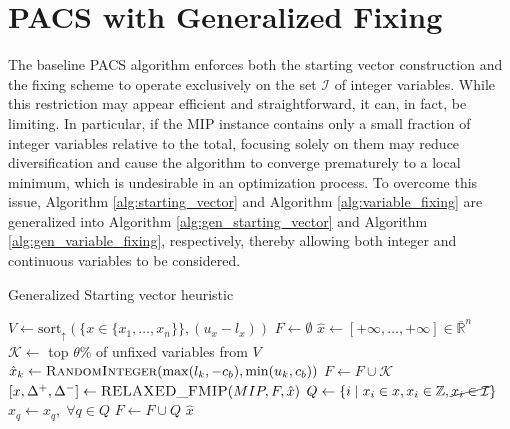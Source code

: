 \section{PACS with Generalized Fixing}\label{sec:gen_fixing}
The baseline PACS algorithm enforces both the starting vector construction and the fixing scheme to operate exclusively on the set $\mathcal{I}$ of integer variables. While this restriction may appear efficient and straightforward, it can, in fact, be limiting. In particular, if the MIP instance contains only a small fraction of integer variables relative to the total, focusing solely on them may reduce diversification and cause the algorithm to converge prematurely to a local minimum, which is undesirable in an optimization process.
To overcome this issue, Algorithm \ref{alg:starting_vector} and Algorithm \ref{alg:variable_fixing} are generalized into Algorithm \ref{alg:gen_starting_vector} and Algorithm \ref{alg:gen_variable_fixing}, respectively, thereby allowing both integer and continuous variables to be considered.
\begin{algorithm}[H]
\caption{Generalized Starting vector heuristic}\label{alg:gen_starting_vector}
\begin{algorithmic}[1]
\Require{Original $MIP$ formulation; Percentage of variables to fix $\theta \in (0,100]$; Fixed bound constant $c_b$}
\State $V \gets \text{sort}_\uparrow(\big\{x \in \{x_1,\dots,x_n\}\big\}, (u_x-l_x))$
\State $F \gets \emptyset$
\State $\hat{x} \gets [+\infty, \ldots, +\infty] \in \bar{\mathbb{R}}^{n}$
    \State $\mathcal{K} \gets$ top $\theta \%$ of unfixed variables from $V$
        \State $\hat{x}_k \gets \Call{RandomInteger}{\max(l_k, -c_b), \min(u_k, c_b)}$
    \EndFor
    \State $F \gets F \cup \mathcal{K}$
    \State $[x, \Delta^+, \Delta^-] \gets \Call{RELAXED\_FMIP}{MIP, F, \hat{x}}$
    \State $Q \gets \{i \;|\; x_i \in x, x_i \in \mathbb{Z},\cancel{x_i \in \mathcal{I}}\}$
    \State $\hat{x}_q \gets x_q, \; \forall q \in Q$
    \State $F \gets F \cup Q$
\EndWhile
\State \Return $\hat{x}$
\EndFunction
\end{algorithmic}
\end{algorithm}

